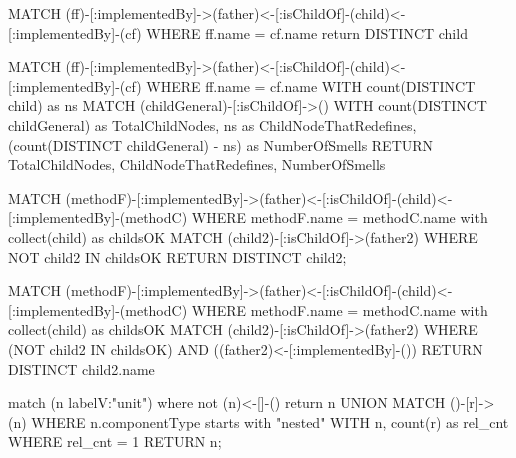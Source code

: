 
MATCH (ff)-[:implementedBy]->(father)<-[:isChildOf]-(child)<-[:implementedBy]-(cf)
WHERE ff.name = cf.name
return DISTINCT child


MATCH (ff)-[:implementedBy]->(father)<-[:isChildOf]-(child)<-[:implementedBy]-(cf)
WHERE ff.name = cf.name
WITH count(DISTINCT child) as ns
MATCH (childGeneral)-[:isChildOf]->()
WITH count(DISTINCT childGeneral) as TotalChildNodes, ns as ChildNodeThatRedefines, (count(DISTINCT childGeneral) - ns) as NumberOfSmells 
RETURN TotalChildNodes, ChildNodeThatRedefines, NumberOfSmells


MATCH (methodF)-[:implementedBy]->(father)<-[:isChildOf]-(child)<-[:implementedBy]-(methodC)
WHERE methodF.name = methodC.name
with collect(child) as childsOK
MATCH (child2)-[:isChildOf]->(father2)
WHERE NOT child2 IN childsOK
RETURN DISTINCT child2;



MATCH (methodF)-[:implementedBy]->(father)<-[:isChildOf]-(child)<-[:implementedBy]-(methodC)
WHERE methodF.name = methodC.name
with collect(child) as childsOK
MATCH (child2)-[:isChildOf]->(father2)
WHERE (NOT child2 IN childsOK) AND ((father2)<-[:implementedBy]-())
RETURN DISTINCT child2.name

match (n {labelV:"unit"}) where not (n)<-[]-() return n
UNION
MATCH ()-[r]->(n) WHERE n.componentType starts with "nested" WITH n, count(r) as rel_cnt WHERE rel_cnt = 1 RETURN n;